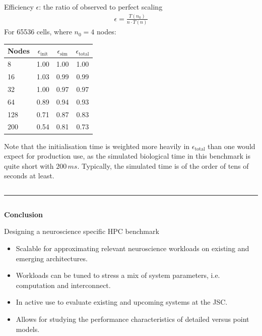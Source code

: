 \documentclass{beamer}
\begin{document}
\begin{frame}[t, fragile]
\begin{columns}[t]
\begin{column}[T]{0.25\textwidth}
      Efficiency $\epsilon$: the ratio of observed to perfect scaling
      \begin{align*}
        \epsilon = \frac{T(n_{0})}{n\cdot T(n)}
      \end{align*}
      For 65536 cells, where $n_{0}= 4$ nodes:
      \begin{center}
        \begin{tabular}{lccc}
          \toprule
          Nodes & $\epsilon_\mathrm{init}$ & $\epsilon_\mathrm{sim}$ & $\epsilon_\mathrm{total}$ \\
          \midrule
          8   & 1.00 & 1.00 & 1.00\\
          16  & 1.03 & 0.99 & 0.99\\
          32  & 1.00 & 0.97 & 0.97\\
          64  & 0.89 & 0.94 & 0.93\\
          128 & 0.71 & 0.87 & 0.83\\
          200 & 0.54 & 0.81 & 0.73\\
          \bottomrule
        \end{tabular}
      \end{center}
      Note that the initialisation time is weighted more heavily in
      $\epsilon_\mathrm{total}$ than one would expect for production use, as the
      simulated biological time in this benchmark is quite short with $200\,ms$.
      Typically, the simulated time is of the order of tens of seconds at least.
    \end{column}
  \end{columns}
  \vspace*{1ex}
  \textcolor{arbgrey}{\rule{\textwidth}{0.5ex}}
  \vspace*{-1ex}
  \begin{columns}[t]
    \begin{column}[T]{0.25\textwidth}
      \textbf{Conclusion}

      Designing a neuroscience specific HPC benchmark
      \begin{itemize}
        \item Scalable for approximating relevant neuroscience
              workloads on existing and emerging architectures.
        \item Workloads can be tuned to stress a mix of system parameters, i.e.
              computation and interconnect.
        \item In active use to evaluate existing and upcoming systems at the JSC.
        \item Allows for studying the performance characteristics of detailed versus point models.
      \end{itemize}


\end{column}
\end{columns}
\end{frame}
\end{document}
